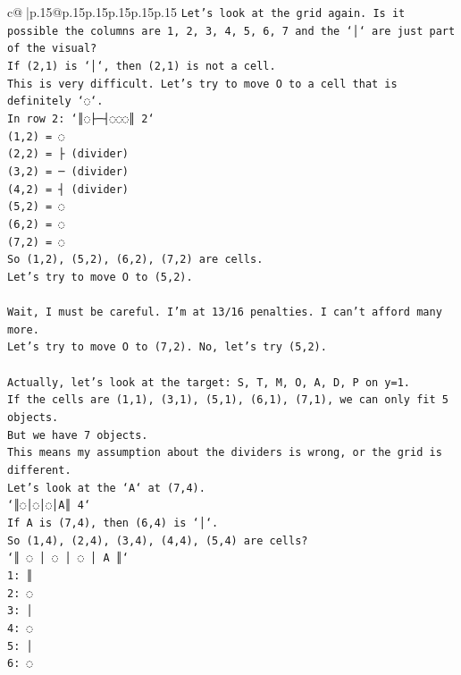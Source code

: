 \documentclass{article}
\begin{document}
{\begin{supertabular}{c@{$\;$}|p{.15\linewidth}@{}p{.15\linewidth}p{.15\linewidth}p{.15\linewidth}p{.15\linewidth}p{.15\linewidth}}
{{{\texttt{Let's look at the grid again. Is it possible the columns are 1, 2, 3, 4, 5, 6, 7 and the `│` are just part of the visual?} \\
\texttt{If (2,1) is `│`, then (2,1) is not a cell.} \\
\texttt{This is very difficult. Let's try to move O to a cell that is definitely `◌`.} \\
\texttt{In row 2: `║◌├─┤◌◌◌║ 2`} \\
\texttt{(1,2) = ◌} \\
\texttt{(2,2) = ├ (divider)} \\
\texttt{(3,2) = ─ (divider)} \\
\texttt{(4,2) = ┤ (divider)} \\
\texttt{(5,2) = ◌} \\
\texttt{(6,2) = ◌} \\
\texttt{(7,2) = ◌} \\
\texttt{So (1,2), (5,2), (6,2), (7,2) are cells.} \\
\texttt{Let's try to move O to (5,2).} \\
\\ 
\texttt{Wait, I must be careful. I'm at 13/16 penalties. I can't afford many more.} \\
\texttt{Let's try to move O to (7,2). No, let's try (5,2).} \\
\\ 
\texttt{Actually, let's look at the target: S, T, M, O, A, D, P on y=1.} \\
\texttt{If the cells are (1,1), (3,1), (5,1), (6,1), (7,1), we can only fit 5 objects.} \\
\texttt{But we have 7 objects.} \\
\texttt{This means my assumption about the dividers is wrong, or the grid is different.} \\
\texttt{Let's look at the `A` at (7,4).} \\
\texttt{`║◌│◌│◌│A║ 4`} \\
\texttt{If A is (7,4), then (6,4) is `│`.} \\
\texttt{So (1,4), (2,4), (3,4), (4,4), (5,4) are cells?} \\
\texttt{`║ ◌ │ ◌ │ ◌ │ A ║`} \\
\texttt{1: ║} \\
\texttt{2: ◌} \\
\texttt{3: │} \\
\texttt{4: ◌} \\
\texttt{5: │} \\
\texttt{6: ◌} \\
}}}
\end{supertabular}}
\end{document}

